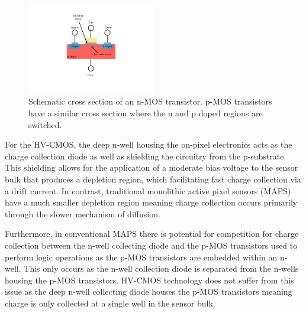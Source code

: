\begin{figure}[h!]
\centering
\includegraphics[width=0.5\textwidth]{CLICdpVertex/Plots/FETDiagram.pdf}
\caption[Schematic cross section of an n-MOS transistor.  p-MOS transistors have a similar cross section where the n and p doped regions are switched.]{Schematic cross section of an n-MOS transistor.  p-MOS transistors have a similar cross section where the n and p doped regions are switched.}
\label{fig:nmos}
\end{figure}

For the HV-CMOS, the deep n-well housing the on-pixel electronics acts as the charge collection diode as well as shielding the circuitry from the p-substrate.  This shielding allows for the application of a moderate bias voltage to the sensor bulk that produces a depletion region, which facilitating fast charge collection via a drift current.  In contrast, traditional monolithic active pixel sensors (MAPS) have a much smaller depletion region meaning charge collection occurs primarily through the slower mechanism of diffusion.  

Furthermore, in conventional MAPS there is potential for competition for charge collection between the n-well collecting diode and the p-MOS transistors used to perform logic operations as the p-MOS transistors are embedded within an n-well.  This only occurs as the n-well collection diode is separated from the n-wells housing the p-MOS transistors.  HV-CMOS technology does not suffer from this issue as the deep n-well collecting diode houses the p-MOS transistors meaning charge is only collected at a single well in the sensor bulk.  

